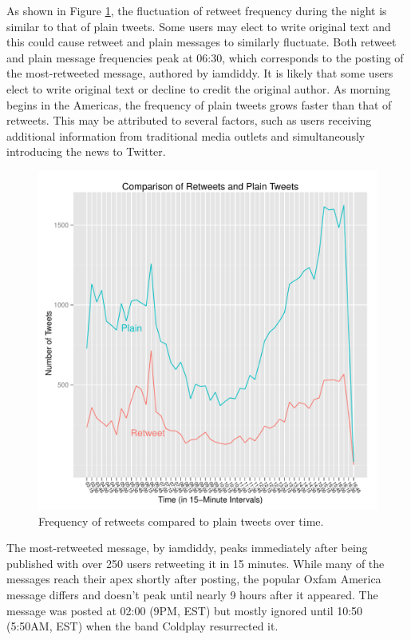 \documentclass[a4paper, 11pt, titlepage]{article}
\begin{document}
As shown in Figure \ref{fig:rt_compare_over_time}, the fluctuation of retweet frequency during the night is similar to that of plain tweets.  Some users may elect to write original text and this could cause retweet and plain messages to similarly fluctuate.  Both retweet and plain message frequencies peak at 06:30, which corresponds to the posting of the most-retweeted message, authored by iamdiddy.  It is likely that some users elect to write original text or decline to credit the original author.  As morning begins in the Americas, the frequency of plain tweets grows faster than that of retweets.  This may be attributed to several factors, such as users receiving additional information from traditional media outlets and simultaneously introducing the news to Twitter.  

\begin{figure}[h]
\centering
\includegraphics[width=120mm]{../figures/rt_compare_over_time}
\caption{Frequency of retweets compared to plain tweets over time.}
\label{fig:rt_compare_over_time}
\end{figure}

The most-retweeted message, by iamdiddy, peaks immediately after being published with over 250 users retweeting it in 15 minutes.  While many of the messages reach their apex shortly after posting, the popular Oxfam America message differs and doesn't peak until nearly 9 hours after it appeared.  The message was posted at 02:00 (9PM, EST) but mostly ignored until 10:50 (5:50AM, EST) when the band Coldplay resurrected it.
\end{document}
